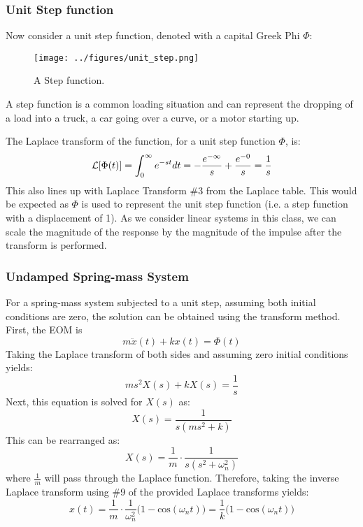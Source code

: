 \documentclass[12pt,letter]{article}
\begin{document}
\subsubsection{Unit Step function}
Now consider a unit step function, denoted with a capital Greek Phi  $\Phi$: 

\begin{figure}[H]
	\centering
	\texttt{[image: ../figures/unit\_step.png]}
	\caption{A Step function. }
\end{figure}

A step function is a common loading situation and can represent the dropping of a load into a truck, a car going over a curve, or a motor starting up. 


The Laplace transform of the function, for a unit step function $\Phi$, is: 
\begin{equation*}
\mathcal{L}{\left[\Phi(t)\right]} = \int_{0}^{\infty} e^{-st}dt = -\frac{e^{-\infty}}{s} +\frac{e^{-0}}{s} =\frac{1}{s}
\end{equation*}
This also lines up with Laplace Transform \#3 from the Laplace table. This would be expected as $\Phi$ is used to represent the unit step function (i.e. a step function with a displacement of 1). As we consider linear systems in this class, we can scale the magnitude of the response by the magnitude of the impulse after the transform is performed. 

\subsubsection{Undamped Spring-mass System}

For a spring-mass system subjected to a unit step, assuming both initial conditions are zero, the solution can be obtained using the transform method. First, the EOM is 
\begin{equation}
m\ddot{x}(t) + kx(t) = \Phi(t)
\end{equation}
Taking the Laplace transform of both sides and assuming zero initial conditions yields:
\begin{equation}
	ms^2X(s)+kX(s) =\frac{1}{s}
\end{equation}
Next, this equation is solved for $X(s)$ as:
\begin{equation}
	X(s) = \frac{1}{s(ms^2+k)}
\end{equation}
This can be rearranged as:
\begin{equation}
	X(s) = \frac{1}{m} \cdot \frac{1}{s(s^2+\omega_n^2)}
\end{equation}
where $\frac{1}{m}$ will pass through the Laplace function. Therefore, taking the inverse Laplace transform using \#9 of the provided Laplace transforms yields:
\begin{equation}
	x(t) = \frac{1}{m} \cdot \frac{1}{\omega_n^2}\big(1-\text{cos}(\omega_n t)\big) = \frac{1}{k}\big(1-\text{cos}(\omega_n t)\big)
\end{equation}
 
\end{document}
